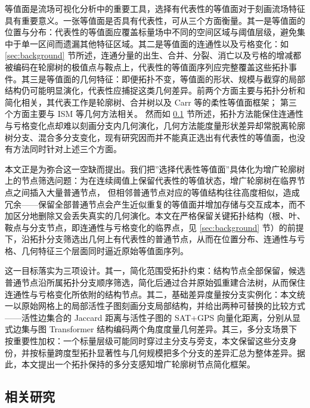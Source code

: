 \documentclass[twocolumn, a4paper, 10pt]{article}
\begin{document}
等值面是流场可视化分析中的重要工具，选择有代表性的等值面对于刻画流场特征具有重要意义。一张等值面是否具有代表性，可从三个方面衡量。其一是等值面的位置与分布：代表性的等值面应覆盖标量场中不同的空间区域与阈值层级，避免集中于单一区间而遗漏其他特征区域。其二是等值面的连通性以及亏格变化：如 \ref{sec:background} 节所述，连通分量的出生、合并、分裂、消亡以及亏格的增减都被编码在轮廓树的极值点与鞍点上，代表性的等值面序列应完整覆盖这些拓扑事件。其三是等值面的几何特征：即便拓扑不变，等值面的形状、规模与截穿的局部结构仍可能明显演化，代表性应捕捉这类几何差异。前两个方面主要与拓扑分析和简化相关，其代表工作是轮廓树、合并树以及 Carr 等的柔性等值面框架；\cite{carr_contour_2003,carr_flexible_2010,gueunet_act_2019} 第三个方面主要与 ISM 等几何方法相关。\cite{bruckner_ism_2010} 然而如 \ref{sec:related} 节所述，拓扑方法能保住连通性与亏格变化点却难以刻画分支内几何演化，几何方法能度量形状差异却常脱离轮廓树分支、混合多分支变化，现有研究因而并不能真正选出有代表性的等值面，也没有方法同时针对上述三个方面。

本文正是为弥合这一空缺而提出。我们把”选择代表性等值面”具体化为增广轮廓树上的节点筛选问题：为在连续阈值上保留代表性的等值状态，增广轮廓树在临界节点之间插入大量普通节点，\cite{gueunet_act_2019,lukasczyk_extreem_2023,li_distributed_2024} 但相邻普通节点对应的等值结构往往高度相似，造成冗余——保留全部普通节点会产生近似重复的等值面并增加存储与交互成本，而不加区分地删除又会丢失真实的几何演化。本文在严格保留关键拓扑结构（根、叶、鞍点与分支节点，即连通性与亏格变化的临界点，见 \ref{sec:background} 节）的前提下，沿拓扑分支筛选出几何上有代表性的普通节点，从而在位置分布、连通性与亏格、几何特征三个层面同时逼近原始等值面序列。

这一目标落实为三项设计。其一，简化范围受拓扑约束：结构节点全部保留，候选普通节点沿所属拓扑分支顺序筛选，简化后通过合并原始弧重建合法树，从而保住连通性与亏格变化所依附的结构节点。其二，基础差异度量按分支实例化：本文统一以原始网格上的局部活性子图刻画分支局部结构，并给出两种可替换的比较方式——活性边集合的 Jaccard 距离与活性子图的 SAT+GPS 向量化距离，分别从显式边集与图 Transformer 结构编码两个角度度量几何差异。其三，多分支场景下按重要性加权：一个标量层级可能同时穿过主分支与旁支，本文保留这些分支身份，并按标量跨度型拓扑显著性与几何规模把多个分支的差异汇总为整体差异。据此，本文提出一个拓扑保持的多分支感知增广轮廓树节点简化框架。

\subsection{相关研究}
\label{sec:related}
\end{document}

